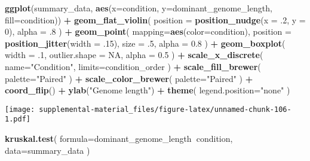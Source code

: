 \documentclass[]{book}
\newenvironment{Shaded}{\begin{snugshade}}{\end{snugshade}}
\newcommand{\DataTypeTok}[1]{\textcolor[rgb]{0.13,0.29,0.53}{#1}}
\newcommand{\DecValTok}[1]{\textcolor[rgb]{0.00,0.00,0.81}{#1}}
\newcommand{\FloatTok}[1]{\textcolor[rgb]{0.00,0.00,0.81}{#1}}
\newcommand{\KeywordTok}[1]{\textcolor[rgb]{0.13,0.29,0.53}{\textbf{#1}}}
\newcommand{\NormalTok}[1]{#1}
\newcommand{\OperatorTok}[1]{\textcolor[rgb]{0.81,0.36,0.00}{\textbf{#1}}}
\newcommand{\OtherTok}[1]{\textcolor[rgb]{0.56,0.35,0.01}{#1}}
\newcommand{\StringTok}[1]{\textcolor[rgb]{0.31,0.60,0.02}{#1}}
\begin{document}
\begin{Shaded}
\begin{Highlighting}[]
\KeywordTok{ggplot}\NormalTok{(summary_data, }\KeywordTok{aes}\NormalTok{(}\DataTypeTok{x=}\NormalTok{condition, }\DataTypeTok{y=}\NormalTok{dominant_genome_length, }\DataTypeTok{fill=}\NormalTok{condition)) }\OperatorTok{+}
\StringTok{  }\KeywordTok{geom_flat_violin}\NormalTok{(}
    \DataTypeTok{position =} \KeywordTok{position_nudge}\NormalTok{(}\DataTypeTok{x =} \FloatTok{.2}\NormalTok{, }\DataTypeTok{y =} \DecValTok{0}\NormalTok{),}
    \DataTypeTok{alpha =} \FloatTok{.8}
\NormalTok{  ) }\OperatorTok{+}
\StringTok{  }\KeywordTok{geom_point}\NormalTok{(}
    \DataTypeTok{mapping=}\KeywordTok{aes}\NormalTok{(}\DataTypeTok{color=}\NormalTok{condition),}
    \DataTypeTok{position =} \KeywordTok{position_jitter}\NormalTok{(}\DataTypeTok{width =} \FloatTok{.15}\NormalTok{),}
    \DataTypeTok{size =} \FloatTok{.5}\NormalTok{,}
    \DataTypeTok{alpha =} \FloatTok{0.8}
\NormalTok{  ) }\OperatorTok{+}
\StringTok{  }\KeywordTok{geom_boxplot}\NormalTok{(}
    \DataTypeTok{width =} \FloatTok{.1}\NormalTok{,}
    \DataTypeTok{outlier.shape =} \OtherTok{NA}\NormalTok{,}
    \DataTypeTok{alpha =} \FloatTok{0.5}
\NormalTok{  ) }\OperatorTok{+}
\StringTok{  }\KeywordTok{scale_x_discrete}\NormalTok{(}
    \DataTypeTok{name=}\StringTok{"Condition"}\NormalTok{,}
    \DataTypeTok{limits=}\NormalTok{condition_order}
\NormalTok{  ) }\OperatorTok{+}
\StringTok{  }\KeywordTok{scale_fill_brewer}\NormalTok{(}
    \DataTypeTok{palette=}\StringTok{"Paired"}
\NormalTok{  ) }\OperatorTok{+}
\StringTok{  }\KeywordTok{scale_color_brewer}\NormalTok{(}
    \DataTypeTok{palette=}\StringTok{"Paired"}
\NormalTok{  ) }\OperatorTok{+}
\StringTok{  }\KeywordTok{coord_flip}\NormalTok{() }\OperatorTok{+}
\StringTok{  }\KeywordTok{ylab}\NormalTok{(}\StringTok{"Genome length"}\NormalTok{) }\OperatorTok{+}
\StringTok{  }\KeywordTok{theme}\NormalTok{(}
    \DataTypeTok{legend.position=}\StringTok{"none"}
\NormalTok{  )}
\end{Highlighting}
\end{Shaded}

\texttt{[image: supplemental-material\_files/figure-latex/unnamed-chunk-106-1.pdf]}

\begin{Shaded}
\begin{Highlighting}[]
\KeywordTok{kruskal.test}\NormalTok{(}
  \DataTypeTok{formula=}\NormalTok{dominant_genome_length}\OperatorTok{~}\NormalTok{condition,}
  \DataTypeTok{data=}\NormalTok{summary_data}
\NormalTok{)}
\end{Highlighting}
\end{Shaded}
\end{document}
